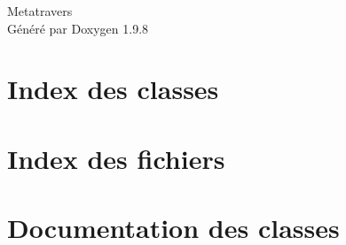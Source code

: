 \documentclass[twoside]{book}
\newcommand{\+}{\discretionary{\mbox{\scriptsize$\hookleftarrow$}}{}{}}
\newcommand{\clearemptydoublepage}{%
    \newpage{\pagestyle{empty}\cleardoublepage}%
  }
\begin{document}
  \raggedbottom
    \hypersetup{pageanchor=false,
                bookmarksnumbered=true,
                pdfencoding=unicode
               }
  \begin{titlepage}
  \vspace*{7cm}
  \begin{center}%
  {\Large Metatravers}\\
  \vspace*{1cm}
  {\large Généré par Doxygen 1.9.8}\\
  \end{center}
  \end{titlepage}
  \clearemptydoublepage
  \tableofcontents
  \clearemptydoublepage
  \hypersetup{pageanchor=true}


\chapter{Index des classes}

\chapter{Index des fichiers}

\chapter{Documentation des classes}




\end{document}
